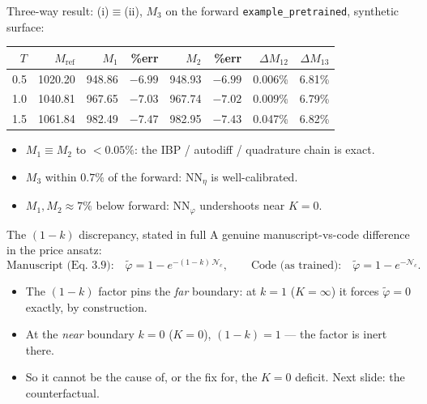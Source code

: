 \documentclass[aspectratio=169,11pt]{beamer}
\newcommand{\gold}[1]{{\color{ntugold}#1}}
\newcommand{\red}[1]{{\color{ntured}#1}}
\begin{document}
\begin{frame}{Three-way result: (i)$\equiv$(ii), $M_3$ on the forward}
  \footnotesize\centering
  \texttt{example\_pretrained}, synthetic surface:\\[0.3em]
  \begin{tabular}{r r r r r r r r}
    \toprule
    $T$ & $M_{\mathrm{ref}}$ & $M_1$ & \%err & $M_2$ & \%err & $\Delta M_{12}$ & $\Delta M_{13}$\\
    \midrule
    0.5 & 1020.20 & 948.86 & $-6.99$ & 948.93 & $-6.99$ & 0.006\% & 6.81\%\\
    1.0 & 1040.81 & 967.65 & $-7.03$ & 967.74 & $-7.02$ & 0.009\% & 6.79\%\\
    1.5 & 1061.84 & 982.49 & $-7.47$ & 982.95 & $-7.43$ & 0.047\% & 6.82\%\\
    \bottomrule
  \end{tabular}
  \vspace{0.4em}
  \begin{itemize}\scriptsize
    \item $M_1\equiv M_2$ to $<0.05\%$: the IBP / autodiff / quadrature chain is exact.
    \item $M_3$ within $0.7\%$ of the forward: \gold{$\mathrm{NN}_\eta$ is well-calibrated}.
    \item $M_1,M_2\approx7\%$ below forward: \red{$\mathrm{NN}_\varphi$ undershoots near $K=0$}.
  \end{itemize}
\end{frame}

\begin{frame}{The $(1-k)$ discrepancy, stated in full}
  \small
  A genuine \gold{manuscript-vs-code} difference in the price ansatz:
  \[
    \text{Manuscript (Eq.~3.9):}\quad \tilde\varphi = 1 - e^{-(1-k)\,\mathcal{N}_c},
    \qquad
    \text{Code (as trained):}\quad \tilde\varphi = 1 - e^{-\mathcal{N}_c}.
  \]
  \begin{itemize}
    \item The $(1-k)$ factor pins the \emph{far} boundary: at $k=1$ ($K=\infty$) it forces
          $\tilde\varphi=0$ exactly, by construction.
    \item At the \emph{near} boundary $k=0$ ($K=0$), \red{$(1-k)=1$} --- the factor is inert there.
    \item So it cannot be the cause of, or the fix for, the $K=0$ deficit. Next slide: the counterfactual.
  \end{itemize}
\end{frame}
\end{document}
